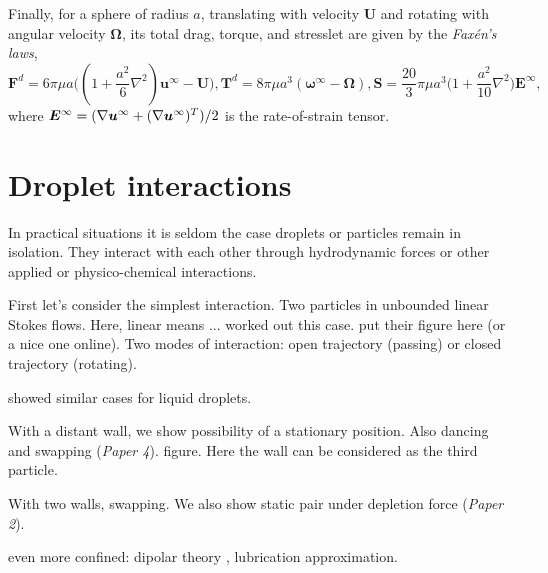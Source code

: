 Finally, for a sphere of radius $a$, translating with velocity $\bm U$ and rotating with angular velocity $\bm \Omega$, its total drag, torque, and stresslet are given by the \emph{Fax\'{e}n's laws},
\begin{subequations} \label{eq:faxen}
 \begin{equation}
   {\bm F}^{d} = 6\pi\mu a\bigg( (1+\frac{a^2}{6}\nabla^2){\bm u^\infty - {\bm U}} \bigg) ,
 \end{equation}
 \begin{equation}
  {\bm T}^{d} = 8\pi\mu a^3 ({\bm \omega}^\infty - {\bm \Omega}),
 \end{equation}
 \begin{equation}
   {\bm S} = \frac{20}{3}\pi\mu a^3 \bigg( 1+\frac{a^2}{10}\nabla^2 \bigg) {\bm E}^\infty ,
 \end{equation}
\end{subequations}
where $\small {\bm E}^\infty=(\nabla {\bm u}^\infty + (\nabla {\bm u}^\infty)^T)/2$ is the rate-of-strain tensor.



\section{Droplet interactions}

In practical situations it is seldom the case droplets or particles remain in isolation. They interact with each other through hydrodynamic forces or other applied or physico-chemical interactions. 

First let's consider the simplest interaction. Two particles in unbounded linear Stokes flows. Here, linear means ...
\cite{batchelor_green_1972} worked out this case. put their figure here (or a nice one online).
Two modes of interaction: open trajectory (passing) or closed trajectory (rotating).

\cite{Zinchenko1983,Zinchenko1984} showed similar cases for liquid droplets.

With a distant wall, we show possibility of a stationary position.
Also dancing and swapping (\emph{Paper 4}). figure.
Here the wall can be considered as the third particle.

With two walls, \cite{zurita-gotor_2007}
swapping.
We also show static pair under depletion force (\emph{Paper 2}).

even more confined:
dipolar theory \citep{Cui2004,Beatus2006,Janssen2012,Uspal2013,Desreumaux,zhu_gallaire_2016,q2d_Beatus,Diamant},
lubrication approximation.

